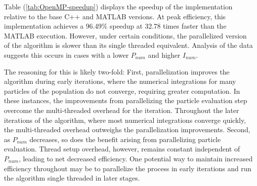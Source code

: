 \noindent Table (\ref{tab:OpenMP-speedup}) displays the speedup of the  
implementation relative to the base C++ and MATLAB versions. At peak efficiency, this implementation
achieves a 96.49\% speedup at 32.78 times faster than the MATLAB execution. However, under certain
conditions, the parallelized version of the algorithm is slower than its single threaded equivalent. Analysis 
of the data suggests this occurs in cases with a lower $P_{num}$ and higher $I_{num}$. \newline

\noindent The reasoning for this
is likely two-fold: First, parallelization improves the algorithm during early iterations, where the numerical 
integrations for many particles of the population do not converge, requiring greater computation. In these 
instances, the improvements from parallelizing the particle evaluation step overcome the multi-threaded overhead
for the iteration. Throughout the later iterations of the algorithm, where most numerical integrations converge quickly,
the multi-threaded overhead outweighs the parallelization improvements. Second,
as $P_{num}$ decreases, so does the benefit arising from parallelizing particle evaluation. Thread setup
overhead, however, remains constant independent of $P_{num}$, leading to net decreased efficiency. One potential way 
to maintain increased efficiency throughout may be to parallelize the process in early iterations and run the algorithm
single threaded in later stages.

\newpage
